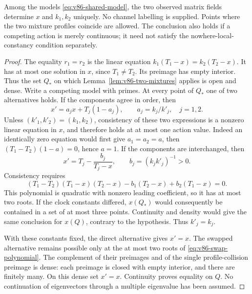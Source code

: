 \begin{theorem}\label{thm:v86-shared}
Among the models \eqref{eq:v86-shared-model}, the two observed matrix
fields determine $x$ and $k_1,k_2$ uniquely. No channel labelling is
supplied. Points where the two mixture profiles coincide are allowed.
The conclusion also holds if a competing action is merely continuous;
it need not satisfy the nowhere-local-constancy condition separately.
\end{theorem}
\begin{proof}
The equality $r_1=r_2$ is the linear equation
$k_1(T_1-x)=k_2(T_2-x)$. It has at most one solution in $x$, since
$T_1\ne T_2$. Its preimage has empty interior. Thus the set $Q_*$
on which Lemma~\ref{lem:v86-two-mixtures} applies is open and dense.
Write a competing model with primes. At every point of $Q_*$ one of
two alternatives holds. If the components agree in order, then
\begin{equation}\label{eq:v86-direct-ambiguity}
 x'=a_jx+T_j(1-a_j),\qquad a_j=k_j/k'_j,\quad j=1,2.
\end{equation}
Unless $(k'_1,k'_2)=(k_1,k_2)$, consistency of these two expressions
is a nonzero linear equation in $x$, and therefore holds at at most
one action value. Indeed an identically zero equation would first
give $a_1=a_2=a$, then $(T_1-T_2)(1-a)=0$, hence $a=1$.
If the components are interchanged, then
\begin{equation}\label{eq:v86-swap-ambiguity}
 x'=T_j-\frac{b_j}{T_j-x},\qquad b_j=(k_jk'_j)^{-1}>0.
\end{equation}
Consistency requires
\begin{equation}\label{eq:v86-swap-polynomial}
 (T_1-T_2)(T_1-x)(T_2-x)-b_1(T_2-x)+b_2(T_1-x)=0.
\end{equation}
This polynomial is quadratic with nonzero leading coefficient, so it
has at most two roots. If the clock constants differed, $x(Q_*)$
would consequently be contained in a set of at most three points.
Continuity and density would give the same conclusion for $x(Q)$,
contrary to the hypothesis. Thus $k'_j=k_j$.

With these constants fixed, the direct alternative gives $x'=x$.
The swapped alternative remains possible only at the at most two
roots of \eqref{eq:v86-swap-polynomial}. The complement of their
preimages and of the single profile-collision preimage is dense:
each preimage is closed with empty interior, and there are finitely
many. On this dense set $x'=x$. Continuity proves equality on $Q$.
No continuation of eigenvectors through a multiple eigenvalue has
been assumed.
\end{proof}

